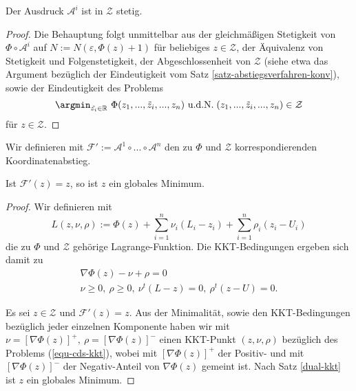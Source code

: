 \begin{korollar}
	\label{satz-cd-stetig}
  	Der Ausdruck $\mathcal{A}^i$ ist in $\mathcal{Z}$ stetig.
\end{korollar}
\begin{proof}
	Die Behauptung folgt unmittelbar aus der gleichmäßigen Stetigkeit von $\Phi \circ \mathcal{A}^i$ auf $N := N(\varepsilon,\Phi(z)+1)$ für beliebiges $z \in \mathcal{Z}$, der Äquivalenz von Stetigkeit und Folgenstetigkeit, der Abgeschlossenheit von $\mathcal{Z}$ (siehe etwa das Argument bezüglich der Eindeutigkeit vom Satz \ref{satz-abstiegsverfahren-konv}), sowie der Eindeutigkeit des Problems
	$$
	\argmin_{\tilde{z_i} \in \mathbb{R}} \
	\Phi(z_1,...,\tilde{z}_i,...,z_n) \
	\text{u.d.N.} \;  (z_1,...,\tilde{z}_i,...,z_n) \in \mathcal{Z}
	$$
	für $z \in \mathcal{Z}$.
\end{proof}

\begin{definition}
	Wir definieren mit $\mathcal{F}' := \mathcal{A}^1 \circ ... \circ \mathcal{A}^n$ den zu $\Phi$ und $\mathcal{Z}$ korrespondierenden Koordinatenabstieg.
\end{definition}

\begin{lemma}
	\label{lemma-cd-kkt}
	Ist $\mathcal{F}'(z) = z$, so ist $z$ ein globales Minimum.
\end{lemma}
\begin{proof}
	Wir definieren mit $$
	L(z,\nu,\rho) := \Phi(z) + \sum_{i=1}^{n}\nu_i (L_i-z_i) + \sum_{i=1}^{n}\rho_i (z_i-U_i)
	$$
	die zu $\Phi$ und $\mathcal{Z}$ gehörige Lagrange-Funktion. Die KKT-Bedingungen ergeben sich damit zu
	\begin{equation}
	\label{equ-cds-kkt}
	\begin{aligned}
	\nabla \Phi(z) - \nu + \rho = 0 \\
	\nu \geq 0 ,\ \rho \geq 0 ,\ \nu^t(L-z) = 0 ,\ \rho^t(z-U) = 0.
	\end{aligned}
	\end{equation}
	
	Es sei $z \in \mathcal{Z}$ und $\mathcal{F}'(z) = z$. Aus der Minimalität, sowie den KKT-Bedingungen bezüglich jeder einzelnen Komponente haben wir mit 
	$\nu = [\nabla \Phi(z)]^+ ,\ \rho = [\nabla \Phi(z)]^-$ einen KKT-Punkt $(z,\nu,\rho)$ bezüglich des Problems (\ref{equ-cds-kkt}), wobei mit $[\nabla \Phi(z)]^+$ der Positiv- und mit $[\nabla \Phi(z)]^-$ der Negativ-Anteil von $\nabla \Phi(z)$ gemeint ist. Nach Satz \ref{dual-kkt} ist $z$ ein globales Minimum.
	
\end{proof}

